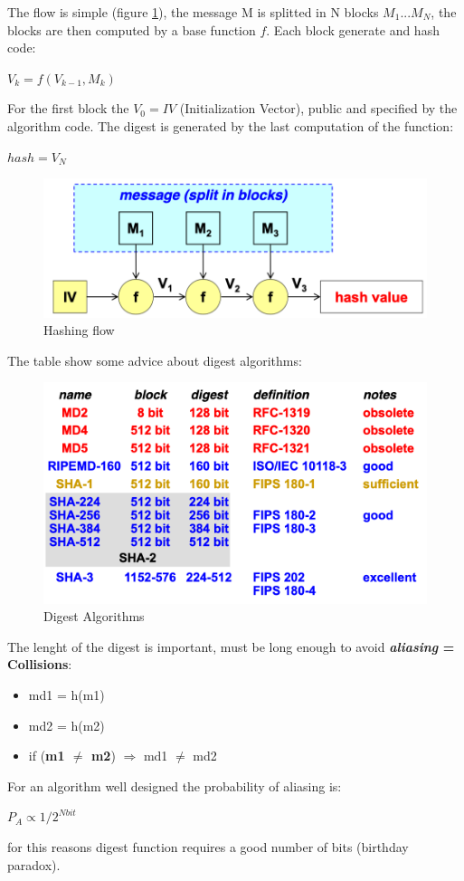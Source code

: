 \documentclass[12pt]{article}
\begin{document}
The flow is simple (figure \ref{fig:digest}), the message M is splitted in N blocks $M_{1} ... M_{N}$, the blocks are then computed by a base function $f$. Each block generate and hash code:
\begin{center}
  $V_k = f(V_{k-1}, M_k)$
\end{center}
For the first block the $V_0 = IV$ (Initialization Vector), public and specified by the algorithm code. The digest is generated by the last computation of the function:
\begin{center}
  $hash = V_{N}$
\end{center}
\begin{figure}[H]
   \centering
   \includegraphics[width=\linewidth]{images/digest.png}
   \caption{Hashing flow}
   \label{fig:digest}
\end{figure}
The table show some advice about digest algorithms:
\begin{figure}[H]
   \centering
   \includegraphics[width=\linewidth]{images/digest_alg.png}
   \caption{Digest Algorithms}
   \label{fig:digest_alg}
\end{figure}

The lenght of the digest is important, must be long enough to avoid \textbf{\textit{aliasing}
= Collisions}:
\begin{itemize}
  \item md1 = h(m1)
  \item md2 = h(m2)
  \item if (\textbf{m1 $\neq$ m2}) $\Rightarrow$ md1 $\neq$ md2
\end{itemize}
For an algorithm well designed the probability of aliasing is:
\begin{center}
  $P_A \propto 1/2^{Nbit}$
\end{center}
for this reasons digest function requires a good number of bits (birthday paradox).\\
\end{document}
